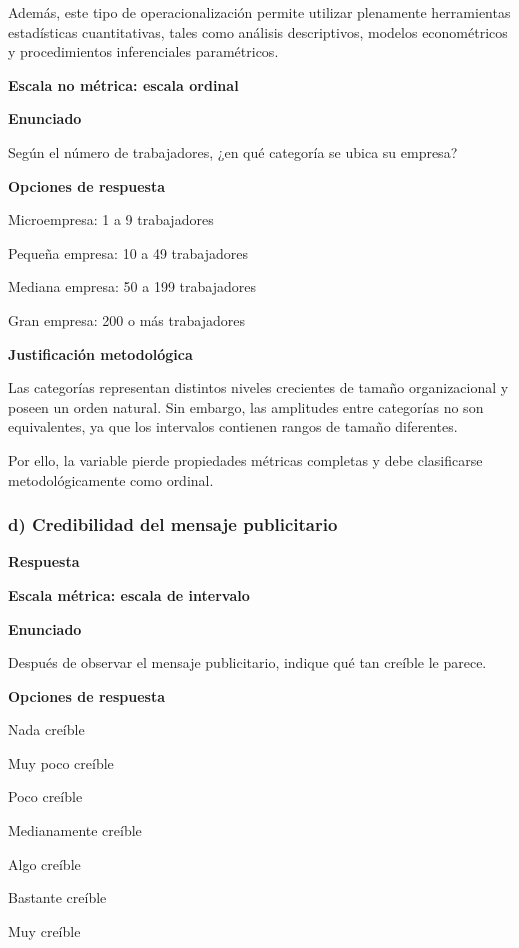 \documentclass[12pt,letterpaper]{article}
\begin{document}
Además, este tipo de operacionalización permite utilizar plenamente herramientas estadísticas cuantitativas, tales como análisis descriptivos, modelos econométricos y procedimientos inferenciales paramétricos.

\textbf{Escala no métrica: escala ordinal}

\textbf{Enunciado}

Según el número de trabajadores, ¿en qué categoría se ubica su empresa?

\textbf{Opciones de respuesta}

\begin{opciones}
\item Microempresa: 1 a 9 trabajadores
\item Pequeña empresa: 10 a 49 trabajadores
\item Mediana empresa: 50 a 199 trabajadores
\item Gran empresa: 200 o más trabajadores
\end{opciones}

\textbf{Justificación metodológica}

Las categorías representan distintos niveles crecientes de tamaño organizacional y poseen un orden natural. Sin embargo, las amplitudes entre categorías no son equivalentes, ya que los intervalos contienen rangos de tamaño diferentes.

Por ello, la variable pierde propiedades métricas completas y debe clasificarse metodológicamente como ordinal.

\subsubsection*{d) Credibilidad del mensaje publicitario}

\textbf{Respuesta}

\textbf{Escala métrica: escala de intervalo}

\textbf{Enunciado}

Después de observar el mensaje publicitario, indique qué tan creíble le parece.

\textbf{Opciones de respuesta}

\begin{opciones}
\item Nada creíble
\item Muy poco creíble
\item Poco creíble
\item Medianamente creíble
\item Algo creíble
\item Bastante creíble
\item Muy creíble
\end{opciones}
\end{document}
